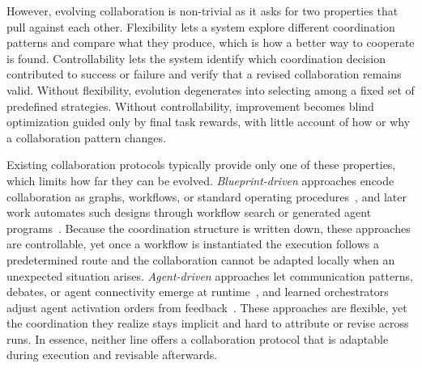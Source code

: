 \documentclass{article} %
\begin{document}
However, evolving collaboration is non-trivial as it asks for two properties that pull against each other. Flexibility lets a system explore different coordination patterns and compare what they produce, which is how a better way to cooperate is found. Controllability lets the system identify which coordination decision contributed to success or failure and verify that a revised collaboration remains valid. Without flexibility, evolution degenerates into selecting among a fixed set of predefined strategies. Without controllability, improvement becomes blind optimization guided only by final task rewards, with little account of how or why a collaboration pattern changes.

Existing collaboration protocols typically provide only one of these properties, which limits how far they can be evolved. \emph{Blueprint-driven} approaches encode collaboration as graphs, workflows, or standard operating procedures~\citep{hong2024metagptmetaprogrammingmultiagent,wu2023autogenenablingnextgenllm,fourney2024magenticonegeneralistmultiagentsolving}, and later work automates such designs through workflow search or generated agent programs~\citep{zhang2025aflowautomatingagenticworkflow,hu2025automateddesignagenticsystems,zhang2025maasagenticsupernet}. Because the coordination structure is written down, these approaches are controllable, yet once a workflow is instantiated the execution follows a predetermined route and the collaboration cannot be adapted locally when an unexpected situation arises. \emph{Agent-driven} approaches let communication patterns, debates, or agent connectivity emerge at runtime~\citep{li2023camelcommunicativeagentsmind,du2023improvingfactualityreasoninglanguage,liu2024dynamicllmpoweredagentnetwork,park2023generativeagentsinteractivesimulacra}, and learned orchestrators adjust agent activation orders from feedback~\citep{dang2025puppeteer}. These approaches are flexible, yet the coordination they realize stays implicit and hard to attribute or revise across runs. In essence, neither line offers a collaboration protocol that is adaptable during execution and revisable afterwards.
\end{document}
